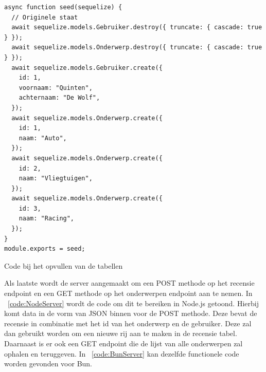 \begin{listing}[H]
  \centering
  \begin{verbatim}
async function seed(sequelize) {
  // Originele staat
  await sequelize.models.Gebruiker.destroy({ truncate: { cascade: true } });
  await sequelize.models.Onderwerp.destroy({ truncate: { cascade: true } });
  await sequelize.models.Gebruiker.create({
    id: 1,
    voornaam: "Quinten",
    achternaam: "De Wolf",
  });
  await sequelize.models.Onderwerp.create({
    id: 1,
    naam: "Auto",
  });
  await sequelize.models.Onderwerp.create({
    id: 2,
    naam: "Vliegtuigen",
  });
  await sequelize.models.Onderwerp.create({
    id: 3,
    naam: "Racing",
  });
}
module.exports = seed;
\end{verbatim}
\caption[Opvulling tabellen]{\label{code:Seed}Code bij het opvullen van de tabellen}
\end{listing}

Als laatste wordt de server aangemaakt om een POST methode op het recensie endpoint en een GET methode op het onderwerpen endpoint aan te nemen.
In ~\ref{code:NodeServer} wordt de code om dit te bereiken in Node.js getoond. Hierbij komt data in de vorm van JSON binnen voor de POST methode.
Deze bevat de recensie in combinatie met het id van het onderwerp en de gebruiker.
Deze zal dan gebruikt worden om een nieuwe rij aan te maken in de recensie tabel.
Daarnaast is er ook een GET endpoint die de lijst van alle onderwerpen zal ophalen en teruggeven.
In ~\ref{code:BunServer} kan dezelfde functionele code worden gevonden voor Bun.

